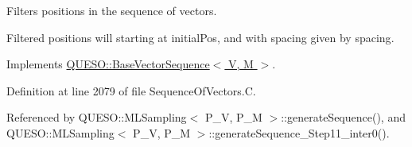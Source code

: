 Filters positions in the sequence of vectors. 

Filtered positions will starting at {\ttfamily initial\-Pos}, and with spacing given by {\ttfamily spacing}. 

Implements \hyperlink{class_q_u_e_s_o_1_1_base_vector_sequence_adfb88fdbaa1c6b2b040ef888633619ef}{Q\-U\-E\-S\-O\-::\-Base\-Vector\-Sequence$<$ V, M $>$}.



Definition at line 2079 of file Sequence\-Of\-Vectors.\-C.



Referenced by Q\-U\-E\-S\-O\-::\-M\-L\-Sampling$<$ P\-\_\-\-V, P\-\_\-\-M $>$\-::generate\-Sequence(), and Q\-U\-E\-S\-O\-::\-M\-L\-Sampling$<$ P\-\_\-\-V, P\-\_\-\-M $>$\-::generate\-Sequence\-\_\-\-Step11\-\_\-inter0().


